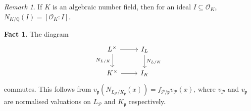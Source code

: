 \documentclass[11pt]{article}
\theoremstyle{definition}
\newtheorem*{fact}{Fact}
\theoremstyle{plain}
\theoremstyle{remark}
\newtheorem*{remark}{Remark}
\newcommand{\QQ}{\mathbb{Q}}
\newcommand{\cO}{\mathcal{O}}
\newcommand{\cP}{\mathcal{P}}
\newcommand{\fp}{\mathfrak{p}}
\begin{document}
\begin{remark}
    If $K$ is an algebraic number field, then for an ideal $I \subseteq \cO_K$, $N_{K / \QQ}(I) = [\cO_K : I]$.
\end{remark}

\begin{fact} The diagram
    \begin{equation*}
    \begin{tikzcd}
        L^\times \arrow[d, "N_{L/K}"'] \arrow[r] & I_L \arrow[d, "N_{L/K}"]\\
        K^\times \arrow[r] & I_K
    \end{tikzcd}
    \end{equation*}
    commutes. This follows from $v_\fp(N_{L_\cP/K_\fp}(x)) = f_{\cP / \fp} v_\cP(x)$, where $v_\cP$ and $v_\fp$ are normalised valuations on $L_\cP$ and $K_\fp$ respectively.
\end{fact}
\end{document}
